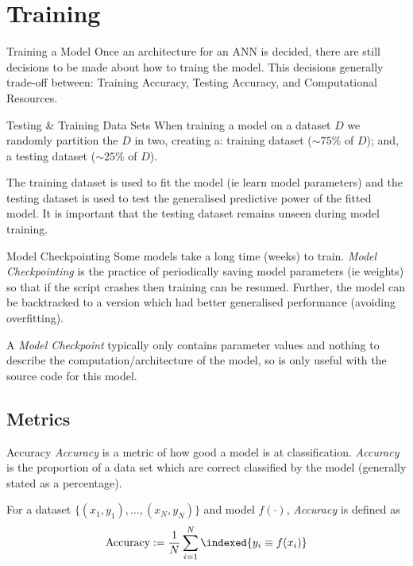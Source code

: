 \documentclass[11pt,a4paper]{article}
\begin{document}
\section{Training} \label{sec_Training}

  \begin{remark}{Training a Model}
    Once an architecture for an ANN is decided, there are still decisions to be made about how to traing the model. This decisions generally trade-off between: Training Accuracy, Testing Accuracy, and Computational Resources.
  \end{remark}

  \begin{proposition}{Testing \& Training Data Sets}
    When training a model on a dataset $D$ we randomly partition the $D$ in two, creating a: training dataset ($\sim75\%$ of $D$); and, a testing dataset ($\sim25\%$ of $D$).
    \par The training dataset is used to fit the model (ie learn model parameters) and the testing dataset is used to test the generalised predictive power of the fitted model. It is important that the testing dataset remains unseen during model training.
  \end{proposition}

  \begin{definition}{Model Checkpointing}
    Some models take a long time (weeks) to train. \textit{Model Checkpointing} is the practice of periodically saving model parameters (ie weights) so that if the script crashes then training can be resumed. Further, the model can be backtracked to a version which had better generalised performance (avoiding overfitting).
    \par A \textit{Model Checkpoint} typically only contains parameter values and nothing to describe the computation/architecture of the model, so is only useful with the source code for this model.
  \end{definition}

\subsection{Metrics} \label{sec_Metrics}

  \begin{definition}{Accuracy}
    \textit{Accuracy} is a metric of how good a model is at classification. \textit{Accuracy} is the proportion of a data set which are correct classified by the model (generally stated as a percentage).
    \par For a dataset $\{(x_1,y_1),\dots,(x_N,y_N)\}$ and model $f(\cdot)$, \textit{Accuracy} is defined as
    \[ \text{Accuracy}:=\frac1N\sum_{i=1}^N\indexed\{y_i\equiv f(x_i)\} \]
  \end{definition}
\end{document}
